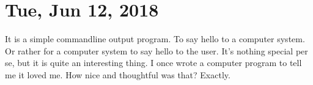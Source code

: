\section{Tue, Jun 12, 2018}



It is a simple commandline output program. To say hello to a computer system. Or
rather for a computer system to say hello to the user. It's nothing special per
se, but it is quite an interesting thing. I once wrote a computer program to
tell me it loved me. How nice and thoughtful was that? Exactly.